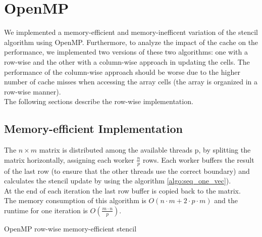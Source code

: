 \documentclass[11pt,a4paper]{article}
\begin{document}

\section{OpenMP} \label{section:openmp}
We implemented a memory-efficient and memory-inefficent variation of the stencil algorithm using OpenMP.
Furthermore, to analyze the impact of the cache on the performance, we implemented two versions of these two algorithms: one with a row-wise and the other with a column-wise approach in updating the cells. The performance of the column-wise approach should be worse due to the higher number of cache misses when accessing the array cells (the array is organized in a row-wise manner).\\
The following sections describe the row-wise implementation.

\subsection{Memory-efficient Implementation}
The $n\times m$ matrix is distributed among the available threads p, by splitting the matrix horizontally, assigning each worker $\frac{n}{p}$ rows. Each worker buffers the result of the last row (to ensure that the other threads use the correct boundary) and calculates the stencil update by using the algorithm \ref{algo:seq_one_vec}).\\
At the end of each iteration the last row buffer is copied back to the matrix.\\
The memory consumption of this algorithm is $O(n \cdot m + 2 \cdot p \cdot m)$ and the runtime for one iteration is $O(\frac{m \cdot n}{p})$.\\

\begin{algorithm}[H] \label{algo:cilk}
 \caption{OpenMP row-wise memory-efficient stencil}
\end{algorithm}
\end{document}
